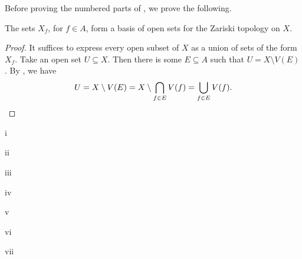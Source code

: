 Before proving the numbered parts of , we prove the following.

\begin{claim}
The sets \(X_f\), for \(f \in A\), form a basis of open sets for the Zariski topology on \(X\).
\end{claim}

\begin{proof}
It suffices to express every open subset of \(X\) as a union of sets of the form \(X_f\).
Take an open set \(U \subseteq X\).
Then there is some \(E \subseteq A\) such that \(U = X \setminus V(E)\).
By , we have
\begin{equation*}
U
= X \setminus V(E)
= X \setminus \bigcap_{f \in E} V(f)
= \bigcup_{f \in E} V(f).
\qedhere
\end{equation*}
\end{proof}

\begin{partsolution}{i}

\end{partsolution}

\begin{partsolution}{ii}

\end{partsolution}

\begin{partsolution}{iii}

\end{partsolution}

\begin{partsolution}{iv}

\end{partsolution}

\begin{partsolution}{v}

\end{partsolution}

\begin{partsolution}{vi}

\end{partsolution}

\begin{partsolution}{vii}

\end{partsolution}